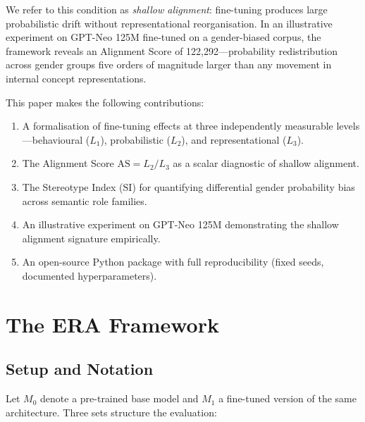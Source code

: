 \documentclass[11pt,a4paper]{article}
\newcommand{\M}[1]{M_{#1}}           %
\newcommand{\AS}{\mathrm{AS}}
\begin{document}
We refer to this condition as \emph{shallow alignment}: fine-tuning produces large
probabilistic drift without representational reorganisation. In an illustrative experiment
on GPT-Neo 125M fine-tuned on a gender-biased corpus, the framework reveals an Alignment
Score of 122{,}292---probability redistribution across gender groups five orders of
magnitude larger than any movement in internal concept representations.

This paper makes the following contributions:
\begin{enumerate}[leftmargin=1.4em, itemsep=2pt]
  \item A formalisation of fine-tuning effects at three independently measurable
    levels---behavioural ($L_1$), probabilistic ($L_2$), and representational ($L_3$).
  \item The Alignment Score $\AS = L_2/L_3$ as a scalar diagnostic of shallow alignment.
  \item The Stereotype Index (SI) for quantifying differential gender probability bias
    across semantic role families.
  \item An illustrative experiment on GPT-Neo 125M demonstrating the shallow alignment
    signature empirically.
  \item An open-source Python package with full reproducibility (fixed seeds, documented
    hyperparameters).
\end{enumerate}

\section{The ERA Framework}

\subsection{Setup and Notation}

Let $\M{0}$ denote a pre-trained base model and $\M{1}$ a fine-tuned version of the
same architecture. Three sets structure the evaluation:
\end{document}
